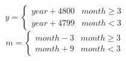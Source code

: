 \documentclass{article}
\begin{document}
\pagestyle{empty}
\[
y = \begin{cases}
  year + 4800 & month \ge 3 \\
  year + 4799 & month < 3
  \end{cases}
\]
\[
m = \begin{cases}
  month - 3 & month \ge 3 \\
  month + 9 & month < 3
  \end{cases}
\]
\end{document}
